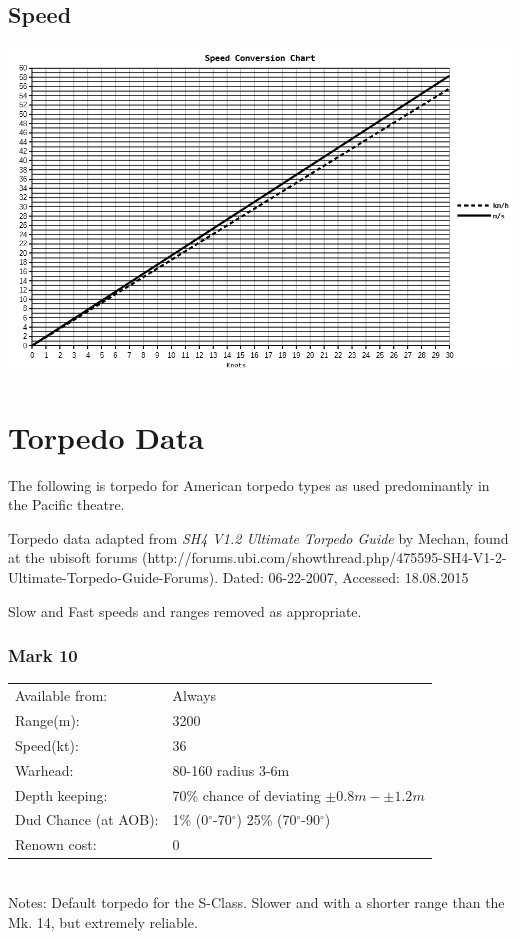 \documentclass{article}
\newcommand{\degree}{$^{\circ}$}
\begin{document}
\subsection{Speed}

\includegraphics[width=\textwidth]{speedConversion}
\pagebreak

\section{Torpedo Data}

The following is torpedo for American torpedo types as used predominantly in the Pacific theatre.

Torpedo data adapted from \emph{SH4 V1.2 Ultimate Torpedo Guide} by Mechan, found at the ubisoft forums (http://forums.ubi.com/showthread.php/475595-SH4-V1-2-Ultimate-Torpedo-Guide-Forums). Dated: 06-22-2007, Accessed: 18.08.2015

Slow and Fast speeds and ranges removed as appropriate.

\subsubsection{Mark 10}
\begin{tabular}{l|l}
Available from:& Always\\
Range(m):& 3200\\
Speed(kt):&36\\
Warhead:& 80-160 radius 3-6m\\
Depth keeping:& 70\% chance of deviating $\pm 0.8m - \pm 1.2m$\\
Dud Chance (at AOB):& 1\% (0\degree -70\degree ) 25\% (70\degree-90\degree)\\
Renown cost:& 0\\
\end{tabular} \\
Notes: Default torpedo for the S-Class. Slower and with a shorter range than the Mk. 14, but extremely reliable.\\
\end{document}
